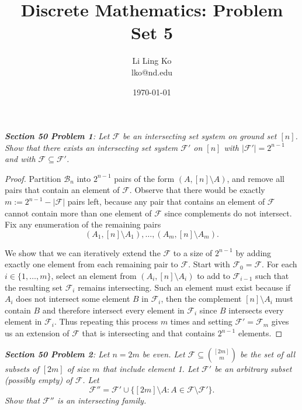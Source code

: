 \documentclass{article}
\begin{document}
\title{Discrete Mathematics: Problem Set 5}
\author{Li Ling Ko\\ lko@nd.edu}
\date{\today}
\maketitle

\it \textbf{Section 50 Problem 1}: Let $\mathcal{F}$ be an intersecting set
  system on ground set $[n]$. Show that there exists an intersecting set
  system $\mathcal{F}'$ on $[n]$ with $|\mathcal{F}'|=2^{n-1}$ and with
  $\mathcal{F}\subseteq\mathcal{F}'$.

  \begin{proof}
    Partition $\mathcal{B}_n$ into $2^{n-1}$ pairs of the form
    $(A,[n]\setminus A)$, and remove all pairs that contain an element of
    $\mathcal{F}$. Observe that there would be exactly
    $m:=2^{n-1}-|\mathcal{F}|$ pairs left, because any pair that contains an
    element of $\mathcal{F}$ cannot contain more than one element of
    $\mathcal{F}$ since complements do not intersect. Fix any enumeration
    of the remaining pairs
    \[(A_1,[n]\setminus A_1), \ldots, (A_m, [n]\setminus A_m).\]

    We show that we can iteratively extend the $\mathcal{F}$ to a size of
    $2^{n-1}$ by adding exactly one element from each remaining pair to
    $\mathcal{F}$. Start with $\mathcal{F}_0=\mathcal{F}$. For each
    $i\in\{1,\ldots,m\}$, select an element from $(A_i,[n]\setminus A_i)$
    to add to $\mathcal{F}_{i-1}$ such that the resulting set
    $\mathcal{F}_i$ remains intersecting. Such an element must exist
    because if $A_i$ does not intersect some element $B$ in
    $\mathcal{F}_i$, then the complement $[n]\setminus A_i$ must contain
    $B$ and therefore intersect every element in $\mathcal{F}_i$ since $B$
    intersects every element in $\mathcal{F}_i$. Thus repeating this
    process $m$ times and setting $\mathcal{F}'=\mathcal{F}_m$ gives us an
    extension of $\mathcal{F}$ that is intersecting and that contains
    $2^{n-1}$ elements.
  \end{proof}

\it \textbf{Section 50 Problem 2}: Let $n=2m$ be even. Let
  $\mathcal{F}\subseteq\binom{[2m]}{m}$ be the set of all subsets of $[2m]$
  of size $m$ that include element 1. Let $\mathcal{F}'$ be an arbitrary
  subset (possibly empty) of $\mathcal{F}$. Let
  \[\mathcal{F}'' =\mathcal{F}' \cup \{[2m]\setminus A:
  A\in\mathcal{F}\setminus\mathcal{F}'\}.\]
  Show that $\mathcal{F}''$ is an intersecting family.
\end{document}
